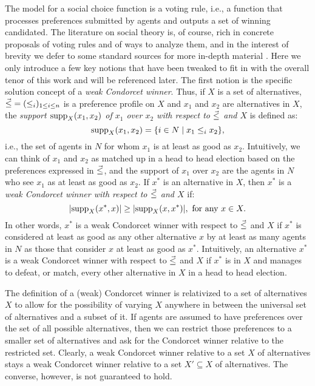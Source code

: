 The model for a social choice function is a voting rule, 
i.e., a function that processes preferences submitted by 
agents and outputs a set of winning candidated.
The literature on social theory is, of course, rich in 
concrete proposals of voting rules and of ways to analyze 
them, and in the interest of brevity we defer to some 
standard sources for more in-depth material \cite{Zwicker16,BaumeisterR16}.
Here we only introduce a few key notions that have been tweaked to fit in 
with the overall tenor of this work and will be referenced later.
The first notion is the specific solution concept of a \emph{weak Condorcet winner}.
Thus, if $X$ is a set of alternatives,
${\vec{\le}} = (\le_{i})_{1\le i\le n}$ is a preference profile on $X$
and $x_1$ and $x_2$ are alternatives in $X$, 
the \emph{support ${\operatorname{supp}}_{X}(x_1,x_2)$ of $x_1$ over $x_2$ with respect to ${\vec{\le}}$ and $X$} is defined as:
$$
	{\operatorname{supp}}_{X}(x_1,x_2)=\{i\in N\mid x_1\le_{i} x_2\},
$$
i.e., the set of agents in $N$ for whom $x_1$ is at least as good as $x_2$.
Intuitively, we can think of 
$x_1$ and $x_2$ as matched up in a head to head election based on the preferences expressed in ${\vec{\le}}$,
and the support of $x_1$ over $x_2$ are the agents in $N$ who see $x_1$ as 
at least as good as $x_2$.
If $x^{\ast}$ is an alternative in $X$,
then $x^{\ast}$ is a \emph{weak Condorcet winner with respect to ${\vec{\le}}$ and $X$} if:
	$$
		|{\operatorname{supp}}_{X}(x^{\ast},x)|\ge |{\operatorname{supp}}_{X}(x,x^{\ast})|,~\text{for any}~x\in X.
	$$
In other words, $x^{\ast}$ is a weak Condorcet winner 
with respect to ${\vec{\le}}$ and $X$ if $x^{\ast}$ is considered 
at least as good as any other alternative $x$
by at least as many agents in $N$ as those that consider 
$x$ at least as good as $x^{\ast}$.
Intuitively, an alternative $x^{\ast}$ is a weak Condorcet 
winner with respect to ${\vec{\le}}$ and $X$
if $x^{\ast}$ is in $X$ and manages to defeat, 
or match, every other alternative in $X$ in 
a head to head election.

The definition of a (weak) Condorcet winner 
is relativized to a set of alternatives $X$
to allow for the possibility of varying $X$
anywhere in between the universal set of alternatives
and a subset of it. 
If agents are assumed to have preferences over 
the set of all possible alternatives,
then we can restrict those preferences 
to a smaller set of alternatives and 
ask for the Condorcet winner relative to 
the restricted set.
Clearly, a weak Condorcet winner relative to a set $X$ of alternatives
stays a weak Condorcet winner relative to a set $X'\subseteq X$ of alternatives.
The converse, however, is not guaranteed to hold.

